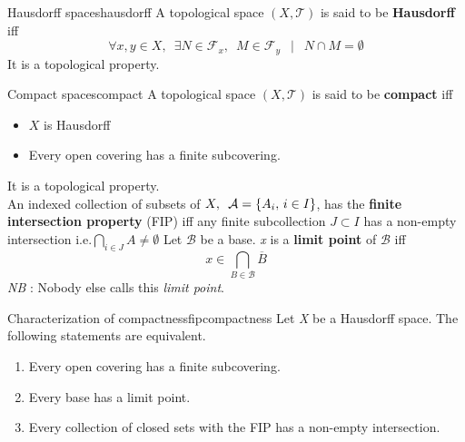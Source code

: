 \begin{mydef}{Hausdorff spaces}{hausdorff}
	A topological space $(X, \mathcal{T})$ is said to be \textbf{Hausdorff} iff 
	$$ \forall x, y \in X, \enspace \exists N \in \mathcal{F}_x, \enspace M \in \mathcal{F}_y \enspace \mid \enspace N \cap M = \emptyset{}  $$
	It is a topological property.
\end{mydef}
\begin{mydef}{Compact spaces}{compact}
	A topological space $(X, \mathcal{T})$ is said to be \textbf{compact} iff
	\begin{itemize}
		\item $X$ is Hausdorff
		\item Every open covering has a finite subcovering.
	\end{itemize}
	It is a topological property.\\[1mm]
	An indexed collection of subsets of $X, \enspace \mathcal{A} = \{A_i, \thinspace i\in I\}$, has the \textbf{finite intersection property} (FIP) iff any finite subcollection $J\subset I$ has a non-empty intersection i.e.$\bigcap\limits_{i \in J} A \neq \emptyset$
	\tcblower
	Let $\mathcal{B}$ be a base. \textit{x} is a \textbf{limit point} of $\mathcal{B}$ iff
	$$x \in \bigcap_{B\in \mathcal{B}} \overline{B}$$
	\textit{NB} : Nobody else calls this \textit{limit point}.
\end{mydef}
\begin{myprop}{Characterization of compactness}{fipcompactness}
	Let \textit{X} be a Hausdorff space. The following statements are equivalent.
	\begin{enumerate}[label=\roman*.]
		\item Every open covering has a finite subcovering.
		\item Every base has a limit point.
		\item Every collection of closed sets with the FIP has a non-empty intersection.
	\end{enumerate}
\end{myprop}

